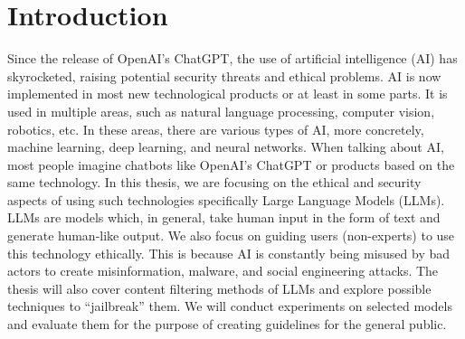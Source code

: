 \chapter{Introduction}


Since the release of OpenAI's ChatGPT, the use of artificial intelligence (AI) has skyrocketed, raising potential security threats and ethical problems. AI is now implemented in most new technological products or at least in some parts. It is used in multiple areas, such as natural language processing, computer vision, robotics, etc. In these areas, there are various types of AI, more concretely, machine learning, deep learning, and neural networks. When talking about AI, most people imagine chatbots like OpenAI's ChatGPT or products based on the same technology. In this thesis, we are focusing on the ethical and security aspects of using such technologies specifically Large Language Models (LLMs). LLMs are models which, in general, take human input in the form of text and generate human-like output. We also focus on guiding users (non-experts) to use this technology ethically. This is because AI is constantly being misused by bad actors to create misinformation, malware, and social engineering attacks. The thesis will also cover content filtering methods of LLMs and explore possible techniques to ``jailbreak'' them. We will conduct experiments on selected models and evaluate them for the purpose of creating guidelines for the general public.
